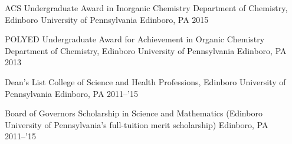 \begin{cvhonors}

  \cvhonor
    {ACS Undergraduate Award in Inorganic Chemistry} %
    {Department of Chemistry, Edinboro University of Pennsylvania} %
    {Edinboro, PA} %
    {2015} %


  \cvhonor
    {POLYED Undergraduate Award for Achievement in Organic Chemistry} %
    {Department of Chemistry, Edinboro University of Pennsylvania} %
    {Edinboro, PA} %
    {2013} %


  \cvhonor
    {Dean's List} %
    {College of Science and Health Professions, Edinboro University of Pennsylvania} %
    {Edinboro, PA} %
    {2011--'15} %


  \cvhonor
    {Board of Governors Scholarship in Science and Mathematics} %
    {(Edinboro University of Pennsylvania's full-tuition merit scholarship)} %
    {Edinboro, PA} %
    {2011--'15} %

\end{cvhonors}


